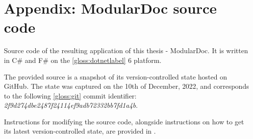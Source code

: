 \section*{Appendix: ModularDoc source code} \label{app:modularDocSourceCode}

Source code of the resulting application of this thesis - ModularDoc.
It is written in C\# and F\# on the \ref{gloss:dotnetlabel} 6 platform.

The provided source is a snapshot of its version-controlled state hosted on GitHub.
The state was captured on the 10th of December, 2022, and corresponds to the following \ref{gloss:git} commit identifier: \textit{2f9d274dbe2487f24114ef9adb72332bb7fd1a4b}.

Instructions for modifying the source code, alongside instructions on how to get its latest version-controlled state, are provided in .
